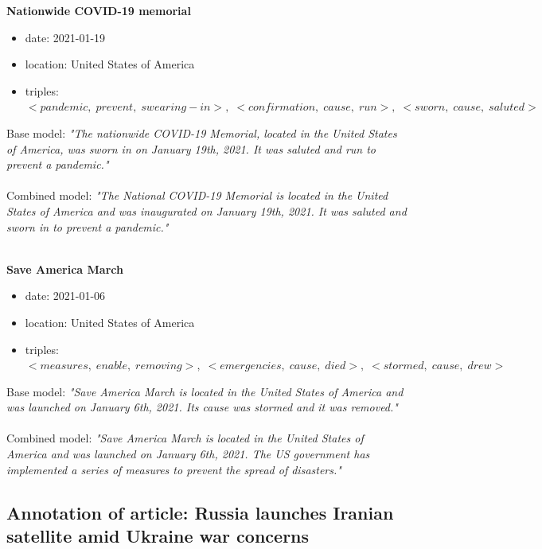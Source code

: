 \documentclass[
hf, %
]{ceurart}
\begin{document}
\textbf{Nationwide COVID-19 memorial}
\begin{itemize}
	\item date: 2021-01-19
	\item location: United States of America
	\item triples: $<pandemic,\;prevent,\;swearing-in>,\; <confirmation,\; cause,\; run>,\; <sworn,\; cause,\; saluted>$
\end{itemize}
Base model: \textit{"The nationwide COVID-19 Memorial, located in the United States of America, was sworn in on January 19th, 2021. It was saluted and run to prevent a pandemic."}\\\\
\noindent
Combined model: \textit{"The National COVID-19 Memorial is located in the United States of America and was inaugurated
	on January 19th, 2021. It was saluted and sworn in to prevent a pandemic."}\\\\
\noindent

\textbf{Save America March}
\begin{itemize}
	\item date: 2021-01-06
	\item location: United States of America
	\item triples: $<measures,\;enable,\;removing>,\; <emergencies,\; cause,\; died>,\; <stormed,\; cause,\; drew>$
\end{itemize}
Base model: \textit{"Save America March is located in the United States of America and was launched on January 6th, 2021. Its cause was stormed and it was removed."}\\\\
\noindent
Combined model: \textit{"Save America March is located in the United States of America and was launched on January 6th, 2021. The US government has implemented a series of measures to prevent the spread of disasters."}



\subsection{Annotation of article: Russia launches Iranian satellite amid Ukraine war concerns}
\label{appx:article_annotation}
\end{document}
